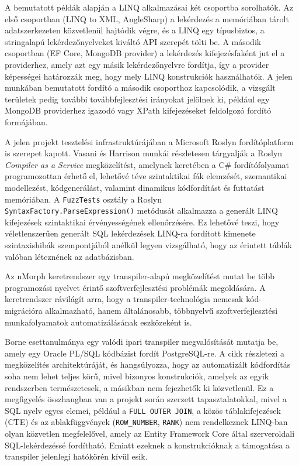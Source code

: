 A bemutatott példák alapján a LINQ alkalmazásai két csoportba sorolhatók. Az első csoportban (LINQ to XML, AngleSharp) a lekérdezés a memóriában tárolt adatszerkezeten közvetlenül hajtódik végre, és a LINQ egy típusbiztos, a stringalapú lekérdezőnyelveket kiváltó API szerepét tölti be. A második csoportban (EF Core, MongoDB provider) a lekérdezés kifejezésfaként jut el a providerhez, amely azt egy másik lekérdezőnyelvre fordítja, így a provider képességei határozzák meg, hogy mely LINQ konstrukciók használhatók. A jelen munkában bemutatott fordító a második csoporthoz kapcsolódik, a vizsgált területek pedig további továbbfejlesztési irányokat jelölnek ki, például egy MongoDB providerhez igazodó vagy XPath kifejezéseket feldolgozó fordító formájában.


A jelen projekt tesztelési infrastruktúrájában a Microsoft Roslyn fordítóplatform is szerepet kapott. Vasani \cite{vasani2017roslyn} és Harrison \cite{harrison2017codegen} munkái részletesen tárgyalják a Roslyn \textit{Compiler as a Service} megközelítést, amelynek keretében a C\# fordítófolyamat programozottan érhető el, lehetővé téve szintaktikai fák elemzését, szemantikai modellezést, kódgenerálást, valamint dinamikus kódfordítást és futtatást memóriában. A \texttt{FuzzTests} osztály a Roslyn \\ \texttt{SyntaxFactory.ParseExpression()} metódusát alkalmazza a generált LINQ kifejezések szintaktikai érvényességének ellenőrzésére. Ez lehetővé teszi, hogy véletlenszerűen generált SQL lekérdezések LINQ-ra fordított kimenete szintaxishibák szempontjából anélkül legyen vizsgálható, hogy az érintett táblák valóban léteznének az adatbázisban.


Az nMorph keretrendszer \cite{nmorph2023} egy transpiler-alapú megközelítést mutat be több programozási nyelvet érintő szoftverfejlesztési problémák megoldására. A keretrendszer rávilágít arra, hogy a transpiler-technológia nemcsak kód-migrációra alkalmazható, hanem általánosabb, többnyelvű szoftverfejlesztési munkafolyamatok automatizálásának eszközeként is.

Borne \cite{borne2021transpiler} esettanulmánya egy valódi ipari transpiler megvalósítását mutatja be, amely egy Oracle PL/SQL kódbázist fordít PostgreSQL-re. A cikk részletezi a megközelítés architektúráját, és hangsúlyozza, hogy az automatizált kódfordítás soha nem lehet teljes körű, mivel bizonyos konstrukciók, amelyek az egyik rendszerben természetesek, a másikban nem fejezhetők ki közvetlenül. Ez a megfigyelés összhangban van a projekt során szerzett tapasztalatokkal, mivel a SQL nyelv egyes elemei, például a \texttt{FULL OUTER JOIN}, a közös táblakifejezések (CTE) és az ablakfüggvények (\texttt{ROW\_NUMBER}, \texttt{RANK}) nem rendelkeznek LINQ-ban olyan közvetlen megfelelővel, amely az Entity Framework Core által szerveroldali SQL-lekérdezéssé fordítható. Emiatt ezeknek a konstrukcióknak a támogatása a transpiler jelenlegi hatókörén kívül esik.

